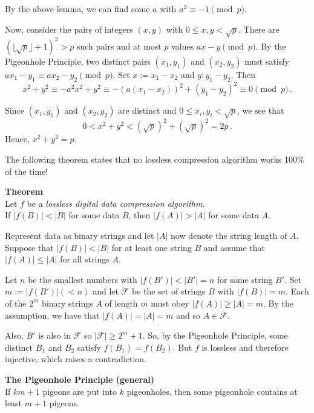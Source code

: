 \documentclass[a4paper]{article}
\let\oldendproof\endproof
\renewenvironment{proof}[1][\proofname]{%
  \oldproof[\scshape \noindent {\bfseries \text{Proof}}]%
}{\oldendproof}
\newenvironment{thm}[1]{
	\begin{framed}
	\noindent
	{\bfseries #1}\\}{
	\end{framed}
}
\newcommand{\Ff}{\mathcal{F}}
\begin{document}
\begin{proof}
By the above lemma, we can find some $a$ with $a^2 \equiv -1 \pmod p$.

Now, consider the pairs of integers $(x,y)$ with $0 \leq x,y < \sqrt{p}$.
There are $(\lfloor\sqrt{p}\rfloor +1)^2 > p$ such pairs and at most $p$ values $ax - y \pmod p$.
By the Pigeonhole Principle,
two distinct pairs $(x_1, y_1)$ and $(x_2, y_2)$ must satisfy
$ax_1 -y_1 \equiv ax_2 - y_2 \pmod p$.
Set $x:= x_1 - x_2$ and $y: y_1 - y_2$.
Then
\[
  x^2 + y^2
  \equiv -a^2x^2 + y^2
  \equiv -(a(x_1 - x_2))^2 + (y_1 - y_2)^2
  \equiv 0 \pmod p\,.
\]

Since $(x_1, y_1)$ and $(x_2, y_2)$ are distinct and $0 \leq x_i, y_i < \sqrt{p}$,
we see that
\[
  0 < x^2 + y^2
	< (\sqrt{p})^2 + (\sqrt{p})^2
	= 2p\,.
\]
Hence, $x^2 + y^2 = p$.
\end{proof}

The following theorem states that no lossless compression algorithm works 100\% of the time!

\begin{thm}{Theorem}
Let $f$ be a \emph{lossless digital data compression algorithm}.\\
If $|f(B)| < |B|$ for some data $B$, then $|f(A)| > |A|$ for some data $A$.
\end{thm}

\begin{proof}
Represent data as binary strings and let $|A|$ now denote the string length of $A$.\\
Suppose that $|f(B)| < |B|$ for at least one string $B$
and assume that $|f(A)| \leq |A|$ for all strings $A$.

Let $n$ be the smallest numbers with $|f(B')| < |B'| = n$ for some string $B'$.
Set $m:= |f(B')| (< n)$ and let $\Ff$ be the set of strings $B$ with $|f(B)| = m$.
Each of the $2^m$ binary strings $A$ of length $m$ must obey $|f(A)| \geq |A| = m$.
By the assumption, we have that $|f(A)| = |A| = m$ and so $A \in \Ff$.

Also, $B'$ is also in $\Ff$ so $|\Ff| \geq 2^m + 1$.
So, by the Pigeonhole Principle,
some distinct $B_1$ and $B_2$ satisfy $f(B_1) = f(B_2)$.
But $f$ is lossless and therefore injective, which raises a contradiction.
\end{proof}

\begin{thm}{The Pigeonhole Principle (general)}
If $km +1$ pigeons are put into $k$ pigeonholes,
then some pigeonhole contains at least $m+1$ pigeons.
\end{thm}
\end{document}
